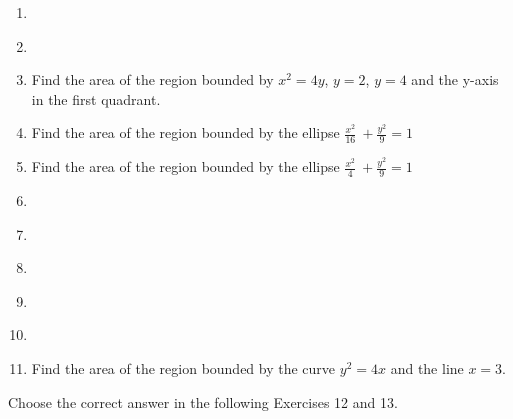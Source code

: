 
\begin{enumerate}[label=\thesection.\arabic*,ref=\thesection.\theenumi]
\item 
\label{chapters/12/8/1/1}

\item 
\label{chapters/12/8/1/2}

\item Find the area of the region bounded by ${x}^2
= 4{y}$, ${y} = 2$, ${y} = 4$ and the y-axis in the
first quadrant.
\label{chapters/12/8/1/3}
\item Find the area of the region bounded by the ellipse \(\frac{{x}^2}{16}\ + \frac{{y}^2}{9} = 1\)
\label{chapters/12/8/1/4}
\item Find the area of the region bounded by the ellipse \(\frac{{x}^2}{4}\ + \frac{{y}^2}{9} = 1\)
\label{chapters/12/8/1/5}
\item 
\label{chapters/12/8/1/6}

\item 
\label{chapters/12/8/1/7}

\item 
\label{chapters/12/8/1/8}

\item 
\label{chapters/12/8/1/9}

\item 
\label{chapters/12/8/1/10}

\item Find the area of the region bounded by the curve ${y}^2
= 4{x}$ and the line ${x} = 3$.
\label{chapters/12/8/1/11}
\end{enumerate}
Choose the correct answer in the following   Exercises 12 and 13.
